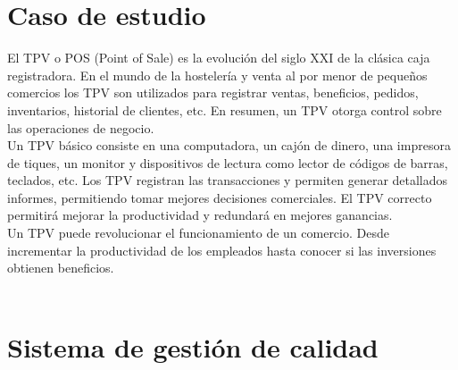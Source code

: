 \documentclass[12pt,a4paper]{article}
\begin{document}
\section{Caso de estudio}\textbf{}
El TPV o POS (Point of Sale) es la evolución del siglo XXI de la clásica caja registradora. En el mundo de la hostelería y venta al por menor de pequeños comercios los TPV son utilizados para registrar ventas, beneficios, pedidos, inventarios, historial de clientes, etc. En resumen, un TPV otorga control sobre las operaciones de negocio.\\
Un TPV básico consiste en una computadora, un cajón de dinero, una impresora de tiques, un monitor y dispositivos de lectura como lector de códigos de barras, teclados, etc. Los TPV registran las transacciones y permiten generar detallados informes, permitiendo tomar mejores decisiones comerciales. El TPV correcto permitirá mejorar la productividad y redundará en mejores ganancias.\\
Un TPV puede revolucionar el funcionamiento de un comercio. Desde incrementar la productividad de los empleados hasta conocer si las inversiones obtienen beneficios.\\\\

\section{Sistema de gestión de calidad}\textbf{}
\end{document}
